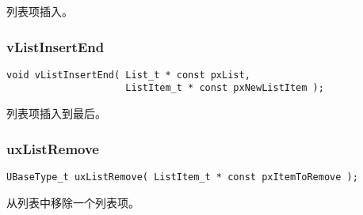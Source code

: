 \documentclass[12pt, a4paper]{article}
\begin{document}
列表项插入。

\subsubsection {vListInsertEnd}

\begin{lstlisting}[language={[ANSI]C},keywordstyle=\color{blue!70},commentstyle=\color{red!50!green!50!blue!50},frame=shadowbox, rulesepcolor=\color{red!20!green!20!blue!20}]
void vListInsertEnd( List_t * const pxList,
                     ListItem_t * const pxNewListItem );
\end{lstlisting}

列表项插入到最后。

\subsubsection {uxListRemove}

\begin{lstlisting}[language={[ANSI]C},keywordstyle=\color{blue!70},commentstyle=\color{red!50!green!50!blue!50},frame=shadowbox, rulesepcolor=\color{red!20!green!20!blue!20}]
UBaseType_t uxListRemove( ListItem_t * const pxItemToRemove );
\end{lstlisting}

从列表中移除一个列表项。
\end{document}
